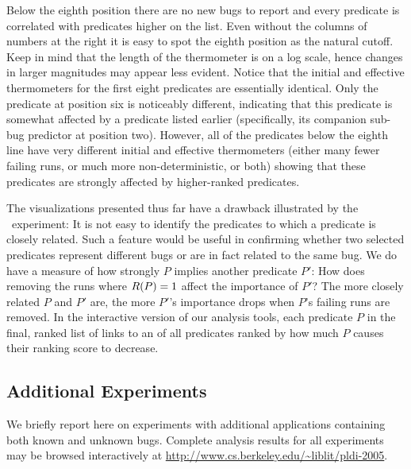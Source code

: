 Below the eighth position there are no new bugs to report and every
predicate is correlated with predicates higher on the list.  Even
without the columns of numbers at the right it is easy to spot the
eighth position as the natural cutoff.  Keep in mind that the length
of the thermometer is on a log scale, hence changes in larger
magnitudes may appear less evident.  Notice that the initial and
effective thermometers for the first eight predicates are essentially
identical.  Only the predicate at position six is noticeably
different, indicating that this predicate is somewhat affected by a
predicate listed earlier (specifically, its companion sub-bug
predictor at position two).  However, all of the predicates below the
eighth line have very different initial and effective thermometers
(either many fewer failing runs, or much more non-deterministic, or
both) showing that these predicates are strongly affected by
higher-ranked predicates.

The visualizations presented thus far have a drawback illustrated by
the \moss\ experiment: It is not easy to identify the predicates to
which a predicate is closely related.  Such a feature would be useful
in confirming whether two selected predicates represent different bugs
or are in fact related to the same bug.  We do have a measure of how
strongly $P$ implies another predicate $P'$: How does removing the
runs where $R(P) = 1$ affect the importance of $P'$?  The more
closely related $P$ and $P'$ are, the more $P'$'s importance drops
when $P$'s failing runs are removed.  In the interactive version of
our analysis tools, each predicate $P$ in the final, ranked list of
links to an  of all
predicates ranked by how much $P$ causes their ranking score to
decrease.

\subsection{Additional Experiments}

We briefly report here on experiments with additional applications
containing both known and unknown bugs.  Complete analysis results for
all experiments may be browsed interactively at
\url{http://www.cs.berkeley.edu/~liblit/pldi-2005}.

\subsubsection{\ccrypt}


